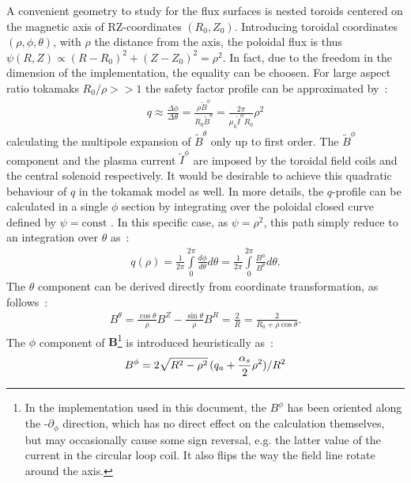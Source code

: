 A convenient geometry to study for the flux surfaces is nested toroids centered on the magnetic axis of RZ-coordinates $(R_0, Z_0)$. Introducing toroidal coordinates $(\rho, \phi, \theta)$, with $\rho$ the distance from the axis, the poloidal flux is thus $\psi(R, Z) \propto (R - R_0)^2 + (Z - Z_0)^2 = \rho^2$. In fact, due to the freedom in the dimension of the implementation, the equality can be choosen. For large aspect ratio tokamaks $R_0/\rho >> 1$ the safety factor profile can be approximated by~:
\begin{align*}
    q \approx \frac{\Delta\phi}{\Delta\theta} = \frac{\rho \tilde{B}^\phi}{R_0 \tilde{B}^\theta} = \frac{2\pi}{\mu_0\tilde{I}^\phi R_0} \rho^2
\end{align*}
calculating the multipole expansion of $\tilde{B}^\theta$ only up to first order. The $\tilde{B}^\phi$ component and the plasma current $\tilde{I}^\phi$ are imposed by the toroidal field coils and the central solenoid respectively. It would be desirable to achieve this quadratic behaviour of $q$ in the tokamak model as well. In more details, the $q$-profile can be calculated in a single $\phi$ section by integrating over the poloidal closed curve defined by $\psi = \text{const}$ \cite[pp.111-112]{wesson_tokamaks_2011}. In this specific case, as $\psi = \rho^2$, this path simply reduce to an integration over $\theta$ as~:
\begin{align}\label{eq:q-profile-th}
    q(\rho) = \frac{1}{2\pi}\int\limits_0^{2\pi} \frac{d\phi}{d\theta}d\theta = \frac{1}{2\pi}\int\limits_0^{2\pi} \frac{B^\phi}{B^\theta}d\theta.
\end{align}
The $\theta$ component can be derived directly from coordinate transformation, as follows~:
\begin{align*}
    B^\theta = \frac{\cos{\theta}}{\rho}B^Z - \frac{\sin{\theta}}{\rho}B^R = \frac{2}{R} = \frac{2}{R_0+\rho\cos{\theta}}.
\end{align*}
The $\phi$ component of $\textbf{B}$\footnote{In the implementation used in this document, the $B^\phi$ has been oriented along the -$\partial_\phi$ direction, which has no direct effect on the calculation themselves, but may occasionally cause some sign reversal, e.g. the latter value of the current in the circular loop coil. It also flips the way the field line rotate around the axis.} is introduced heuristically as~:
\begin{align}\label{eq:bphi-quad}
    B^\phi = 2\sqrt{R^2-\rho^2}\,(q_a+\frac{\alpha_s}{2}\rho^2)/R^2
\end{align}
